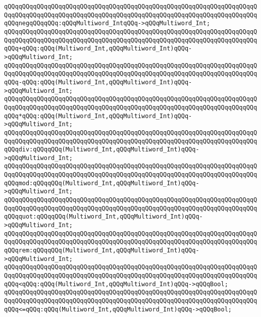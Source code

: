 \verb|qQQqqQQqqQQqqQQqqQQqqQQqqQQqqQQqqQQqqQQqqQQqqQQqqQQqqQQqqQQqqQQqqQQqqQQqqQQqqQQqqQQqqQQqqQQqqQQqqQQqqQQqqQQqqQQqqQQqqQQqqQQqqQQqqQQqqQQqqQQqqQQqnegqQQqqQQq:qQQqMultiword_IntqQQq->qQQqMultiword_Int;|\newline
\verb|qQQqqQQqqQQqqQQqqQQqqQQqqQQqqQQqqQQqqQQqqQQqqQQqqQQqqQQqqQQqqQQqqQQqqQQqqQQqqQQqqQQqqQQqqQQqqQQqqQQqqQQqqQQqqQQqqQQqqQQqqQQqqQQqqQQqqQQqqQQqqQQq+qQQq:qQQq(Multiword_Int,qQQqMultiword_Int)qQQq->qQQqMultiword_Int;|\newline
\verb|qQQqqQQqqQQqqQQqqQQqqQQqqQQqqQQqqQQqqQQqqQQqqQQqqQQqqQQqqQQqqQQqqQQqqQQqqQQqqQQqqQQqqQQqqQQqqQQqqQQqqQQqqQQqqQQqqQQqqQQqqQQqqQQqqQQqqQQqqQQqqQQq-qQQq:qQQq(Multiword_Int,qQQqMultiword_Int)qQQq->qQQqMultiword_Int;|\newline
\verb|qQQqqQQqqQQqqQQqqQQqqQQqqQQqqQQqqQQqqQQqqQQqqQQqqQQqqQQqqQQqqQQqqQQqqQQqqQQqqQQqqQQqqQQqqQQqqQQqqQQqqQQqqQQqqQQqqQQqqQQqqQQqqQQqqQQqqQQqqQQqqQQq*qQQq:qQQq(Multiword_Int,qQQqMultiword_Int)qQQq->qQQqMultiword_Int;|\newline
\verb|qQQqqQQqqQQqqQQqqQQqqQQqqQQqqQQqqQQqqQQqqQQqqQQqqQQqqQQqqQQqqQQqqQQqqQQqqQQqqQQqqQQqqQQqqQQqqQQqqQQqqQQqqQQqqQQqqQQqqQQqqQQqqQQqqQQqqQQqqQQqqQQqdiv:qQQqqQQq(Multiword_Int,qQQqMultiword_Int)qQQq->qQQqMultiword_Int;|\newline
\verb|qQQqqQQqqQQqqQQqqQQqqQQqqQQqqQQqqQQqqQQqqQQqqQQqqQQqqQQqqQQqqQQqqQQqqQQqqQQqqQQqqQQqqQQqqQQqqQQqqQQqqQQqqQQqqQQqqQQqqQQqqQQqqQQqqQQqqQQqqQQqqQQqmod:qQQqqQQq(Multiword_Int,qQQqMultiword_Int)qQQq->qQQqMultiword_Int;|\newline
\verb|qQQqqQQqqQQqqQQqqQQqqQQqqQQqqQQqqQQqqQQqqQQqqQQqqQQqqQQqqQQqqQQqqQQqqQQqqQQqqQQqqQQqqQQqqQQqqQQqqQQqqQQqqQQqqQQqqQQqqQQqqQQqqQQqqQQqqQQqqQQqqQQqquot:qQQqqQQq(Multiword_Int,qQQqMultiword_Int)qQQq->qQQqMultiword_Int;|\newline
\verb|qQQqqQQqqQQqqQQqqQQqqQQqqQQqqQQqqQQqqQQqqQQqqQQqqQQqqQQqqQQqqQQqqQQqqQQqqQQqqQQqqQQqqQQqqQQqqQQqqQQqqQQqqQQqqQQqqQQqqQQqqQQqqQQqqQQqqQQqqQQqqQQqrem:qQQqqQQq(Multiword_Int,qQQqMultiword_Int)qQQq->qQQqMultiword_Int;|\newline
\verb|qQQqqQQqqQQqqQQqqQQqqQQqqQQqqQQqqQQqqQQqqQQqqQQqqQQqqQQqqQQqqQQqqQQqqQQqqQQqqQQqqQQqqQQqqQQqqQQqqQQqqQQqqQQqqQQqqQQqqQQqqQQqqQQqqQQqqQQqqQQqqQQq<qQQq:qQQq(Multiword_Int,qQQqMultiword_Int)qQQq->qQQqBool;|\newline
\verb|qQQqqQQqqQQqqQQqqQQqqQQqqQQqqQQqqQQqqQQqqQQqqQQqqQQqqQQqqQQqqQQqqQQqqQQqqQQqqQQqqQQqqQQqqQQqqQQqqQQqqQQqqQQqqQQqqQQqqQQqqQQqqQQqqQQqqQQqqQQqqQQq<=qQQq:qQQq(Multiword_Int,qQQqMultiword_Int)qQQq->qQQqBool;|\newline
